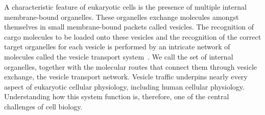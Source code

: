 A characteristic feature of eukaryotic cells is the presence of multiple internal membrane-bound organelles. 
These organelles exchange molecules amongst themselves in small membrane-bound packets called vesicles. 
%
The recognition of cargo molecules to be loaded onto these vesicles and the recognition of the correct target organelles for each vesicle is performed by an intricate network of molecules called the vesicle transport system~\cite{alberts2002molecular}. 
%
We call the set of internal organelles, together with the molecular routes that connect them through vesicle exchange, the vesicle transport network. 
%
Vesicle traffic underpins nearly every aspect of eukaryotic cellular physiology, including
human cellular physiology.
%
Understanding how this system function is, therefore,
one of the central challenges of cell biology.

\vspace{0.5cm}

